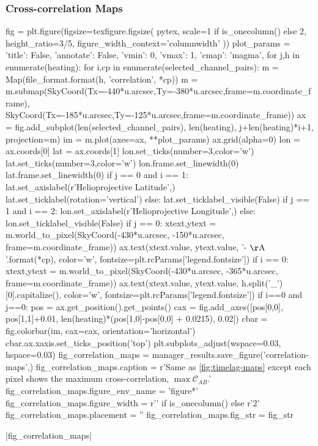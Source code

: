 \subsubsection{Cross-correlation Maps}\label{cross_correlation_maps}

\begin{pycode}
fig = plt.figure(figsize=texfigure.figsize(
    pytex,
    scale=1 if is_onecolumn() else 2,
    height_ratio=3/5,
    figure_width_context='columnwidth'
))
plot_params = {'title': False, 'annotate': False, 'vmin': 0, 'vmax': 1, 'cmap': 'magma',}
for j,h in enumerate(heating):
    for i,cp in enumerate(selected_channel_pairs):
        m = Map(file_format.format(h, 'correlation', *cp))
        m = m.submap(SkyCoord(Tx=-440*u.arcsec,Ty=-380*u.arcsec,frame=m.coordinate_frame),
                     SkyCoord(Tx=-185*u.arcsec,Ty=-125*u.arcsec,frame=m.coordinate_frame))
        ax = fig.add_subplot(len(selected_channel_pairs), len(heating), j+len(heating)*i+1,
                             projection=m)
        im = m.plot(axes=ax, **plot_params)
        ax.grid(alpha=0)
        lon = ax.coords[0]
        lat = ax.coords[1]
        lon.set_ticks(number=3,color='w')
        lat.set_ticks(number=3,color='w')
        lon.frame.set_linewidth(0)
        lat.frame.set_linewidth(0)
        if j == 0 and i == 1:
            lat.set_axislabel(r'Helioprojective Latitude',)
            lat.set_ticklabel(rotation='vertical')
        else:
            lat.set_ticklabel_visible(False)
        if j == 1 and i == 2:
            lon.set_axislabel(r'Helioprojective Longitude',)
        else:
            lon.set_ticklabel_visible(False)
        if j == 0:
            xtext,ytext = m.world_to_pixel(SkyCoord(-430*u.arcsec, -150*u.arcsec, frame=m.coordinate_frame))
            ax.text(xtext.value, ytext.value, '{}-{} $\mathrm{{\AA}}$'.format(*cp),
                    color='w', fontsize=plt.rcParams['legend.fontsize'])
        if i == 0:
            xtext,ytext = m.world_to_pixel(SkyCoord(-430*u.arcsec, -365*u.arcsec, frame=m.coordinate_frame))
            ax.text(xtext.value, ytext.value, h.split('_')[0].capitalize(),
                color='w', fontsize=plt.rcParams['legend.fontsize'])
        if i==0 and j==0:
            pos = ax.get_position().get_points()
            cax = fig.add_axes([pos[0,0], pos[1,1]+0.01, len(heating)*(pos[1,0]-pos[0,0] + 0.0215), 0.02])
            cbar = fig.colorbar(im, cax=cax, orientation='horizontal')
            cbar.ax.xaxis.set_ticks_position('top')
plt.subplots_adjust(wspace=0.03, hspace=0.03)
fig_correlation_maps = manager_results.save_figure('correlation-maps',)
fig_correlation_maps.caption = r'Same as \autoref{fig:timelag-maps} except each pixel shows the maximum cross-correlation, $\max\mathcal{C}_{AB}$.'
fig_correlation_maps.figure_env_name = 'figure*'
fig_correlation_maps.figure_width = r'\columnwidth' if is_onecolumn() else r'2\columnwidth'
fig_correlation_maps.placement = ''
fig_correlation_maps.fig_str = fig_str
\end{pycode}
|fig_correlation_maps|

